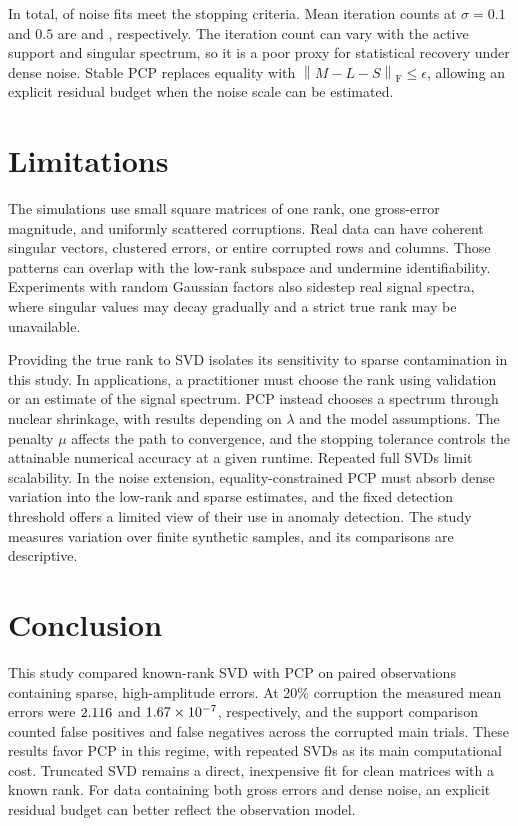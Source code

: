 \documentclass[conference]{IEEEtran}
\newcommand{\fro}[1]{\left\|#1\right\|_{\mathrm F}}
\begin{document}
In total, \NoiseConverged{} of \NoiseTrials{} noise fits meet the stopping criteria. Mean iteration counts at $\sigma=0.1$ and $0.5$ are \NoiseMildIterations{} and \NoiseHighIterations{}, respectively. The iteration count can vary with the active support and singular spectrum, so it is a poor proxy for statistical recovery under dense noise. Stable PCP \cite{zhou2010} replaces equality with $\fro{M-L-S}\le\epsilon$, allowing an explicit residual budget when the noise scale can be estimated.

\section{Limitations}
The simulations use small square matrices of one rank, one gross-error magnitude, and uniformly scattered corruptions. Real data can have coherent singular vectors, clustered errors, or entire corrupted rows and columns. Those patterns can overlap with the low-rank subspace and undermine identifiability. Experiments with random Gaussian factors also sidestep real signal spectra, where singular values may decay gradually and a strict true rank may be unavailable.

Providing the true rank to SVD isolates its sensitivity to sparse contamination in this study. In applications, a practitioner must choose the rank using validation or an estimate of the signal spectrum. PCP instead chooses a spectrum through nuclear shrinkage, with results depending on $\lambda$ and the model assumptions. The penalty $\mu$ affects the path to convergence, and the stopping tolerance controls the attainable numerical accuracy at a given runtime. Repeated full SVDs limit scalability. In the noise extension, equality-constrained PCP must absorb dense variation into the low-rank and sparse estimates, and the fixed detection threshold offers a limited view of their use in anomaly detection. The study measures variation over finite synthetic samples, and its comparisons are descriptive.

\section{Conclusion}
This study compared known-rank SVD with PCP on paired observations containing sparse, high-amplitude errors. At 20\% corruption the measured mean errors were $2.116$ and $1.67\times10^{-7}$, respectively, and the support comparison counted \CorruptFalsePos{} false positives and \CorruptFalseNeg{} false negatives across the corrupted main trials. These results favor PCP in this regime, with repeated SVDs as its main computational cost. Truncated SVD remains a direct, inexpensive fit for clean matrices with a known rank. For data containing both gross errors and dense noise, an explicit residual budget can better reflect the observation model.



\end{document}
